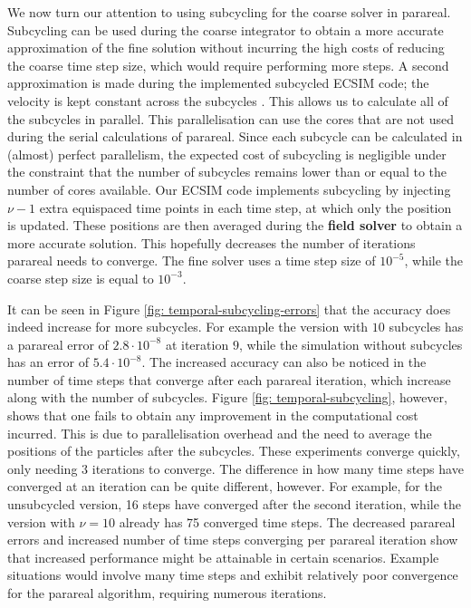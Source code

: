 We now turn our attention to using subcycling for the coarse solver in parareal. Subcycling can be used during the coarse integrator to obtain a more accurate approximation of the fine solution without incurring the high costs of reducing the coarse time step size, which would require performing more steps. A second approximation is made during the implemented subcycled ECSIM code; the velocity is kept constant across the subcycles \cite{lapenta_advances_2023}. This allows us to calculate all of the subcycles in parallel. This parallelisation can use the cores that are not used during the serial calculations of parareal. Since each subcycle can be calculated in (almost) perfect parallelism, the expected cost of subcycling is negligible under the constraint that the number of subcycles remains lower than or equal to the number of cores available. Our ECSIM code implements subcycling by injecting $\nu-1$ extra equispaced time points in each time step, at which only the position is updated. These positions are then averaged during the \textbf{field solver} to obtain a more accurate solution. This hopefully decreases the number of iterations parareal needs to converge. The fine solver uses a time step size of $10^{-5}$, while the coarse step size is equal to $10^{-3}$.

It can be seen in Figure \ref{fig: temporal-subcycling-errors} that the accuracy does indeed increase for more subcycles. For example the version with $10$ subcycles has a parareal error of $2.8\cdot 10^{-8}$ at iteration $9$, while the simulation without subcycles has an error of $5.4\cdot 10^{-8}$.  The increased accuracy can also be noticed in the number of time steps that converge after each parareal iteration, which increase along with the number of subcycles. Figure \ref{fig: temporal-subcycling}, however, shows that one fails to obtain any improvement in the computational cost incurred. This is due to parallelisation overhead and the need to average the positions of the particles after the subcycles. These experiments converge quickly, only needing $3$ iterations to converge. The difference in how many time steps have converged at an iteration can be quite different, however. For example, for the unsubcycled version, 16 steps have converged after the second iteration, while the version with $\nu = 10$ already has 75 converged time steps. The decreased parareal errors and increased number of time steps converging per parareal iteration show that increased performance might be attainable in certain scenarios. Example situations would involve many time steps and exhibit relatively poor convergence for the parareal algorithm, requiring numerous iterations.

